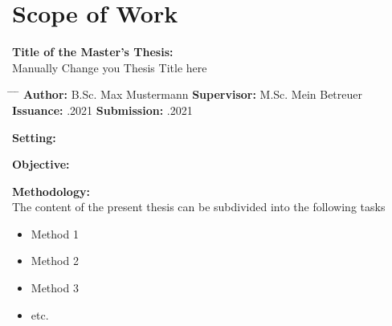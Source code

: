 \chapter*{Scope of Work}


\textbf{Title of the Master's Thesis:}\\
\Large{Manually Change you Thesis Title here}\\
\normalsize

\begin{tabbing}
	\hspace{7em} 		\= \hspace{13em}			\= \hspace{7em} 		\= \kill
	\textbf{Author:}  \> B.Sc. Max Mustermann 	\> \textbf{Supervisor:} 	\>  M.Sc. Mein Betreuer \\
	\textbf{Issuance:} 	.2021 	\> \textbf{Submission:} 	.2021
\end{tabbing}

\vspace{5mm}
\textbf{Setting:}\\
\blindtext%

\vspace{5mm}
\textbf{Objective:}\\
\blindtext

\vspace{5mm}
\textbf{Methodology:} \\
The content of the present thesis can be subdivided into the following tasks
\begin{itemize}
	\item Method 1
	\item Method 2
	\item Method 3
	\item etc.
\end{itemize}
\vspace{1.0cm}


